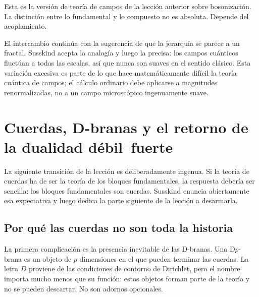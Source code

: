 Esta es la versión de teoría de campos de la lección anterior sobre bosonización. La distinción entre lo fundamental y lo compuesto no es absoluta. Depende del acoplamiento.

\begin{classroomqa}
\end{classroomqa}

El intercambio continúa con la sugerencia de que la jerarquía se parece a un fractal. Susskind acepta la analogía y luego la precisa: los campos cuánticos fluctúan a todas las escalas, así que nunca son suaves en el sentido clásico. Esta variación excesiva es parte de lo que hace matemáticamente difícil la teoría cuántica de campos; el cálculo ordinario debe aplicarse a magnitudes renormalizadas, no a un campo microscópico ingenuamente suave.

\section{Cuerdas, D-branas y el retorno de la dualidad débil--fuerte}

La siguiente transición de la lección es deliberadamente ingenua. Si la teoría de cuerdas ha de ser la teoría de los bloques fundamentales, la respuesta debería ser sencilla: los bloques fundamentales son cuerdas. Susskind enuncia abiertamente esa expectativa y luego dedica la parte siguiente de la lección a desarmarla.

\subsection{Por qué las cuerdas no son toda la historia}

La primera complicación es la presencia inevitable de las D-branas. Una D\(p\)-brana es un objeto de \(p\) dimensiones en el que pueden terminar las cuerdas. La letra \(D\) proviene de las condiciones de contorno de Dirichlet, pero el nombre importa mucho menos que su función: estos objetos forman parte de la teoría y no se pueden descartar. No son adornos opcionales.

